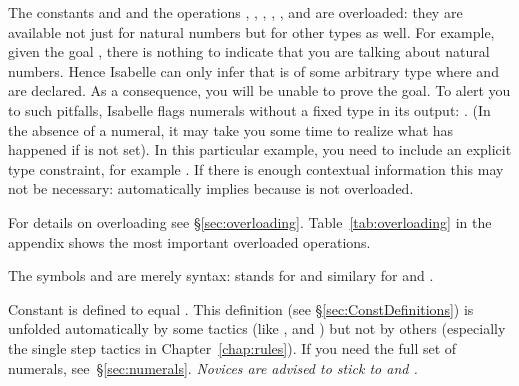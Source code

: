 \begin{isabellebody}
\begin{isamarkuptext}
\begin{warn}
  The constants  and  and the operations
  , ,
  , ,
  ,  and
   are overloaded: they are available
  not just for natural numbers but for other types as well.
  For example, given the goal , there is nothing to indicate
  that you are talking about natural numbers. Hence Isabelle can only infer
  that  is of some arbitrary type where  and \isa{{\isacharplus}} are
  declared. As a consequence, you will be unable to prove the
  goal. To alert you to such pitfalls, Isabelle flags numerals without a
  fixed type in its output: . (In the absence of a numeral,
  it may take you some time to realize what has happened if  is not set).  In this particular example, you need to include
  an explicit type constraint, for example . If there
  is enough contextual information this may not be necessary:  automatically implies  because  is not
  overloaded.

  For details on overloading see \S\ref{sec:overloading}.
  Table~\ref{tab:overloading} in the appendix shows the most important
  overloaded operations.
\end{warn}
\begin{warn}
  The symbols  and
   are merely syntax: 
  stands for  and similary for \isa{{\isasymge}} and
  \isa{{\isasymle}}.
\end{warn}
\begin{warn}
  Constant  is defined to equal . This definition
  (see \S\ref{sec:ConstDefinitions}) is unfolded automatically by some
  tactics (like ,  and ) but not by
  others (especially the single step tactics in Chapter~\ref{chap:rules}).
  If you need the full set of numerals, see~\S\ref{sec:numerals}.
  \emph{Novices are advised to stick to  and .}
\end{warn}


\end{isamarkuptext}
\end{isabellebody}
